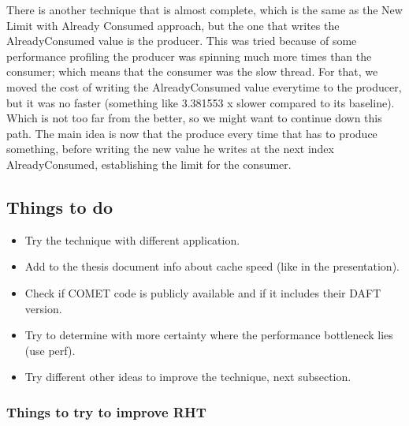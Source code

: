 There is another technique that is almost complete, which is the same as the New Limit with Already Consumed approach, but the one that writes the AlreadyConsumed value is the producer. This was tried because of some performance profiling the producer was spinning much more times than the consumer; which means that the consumer was the slow thread. For that, we moved the cost of writing the AlreadyConsumed value everytime to the producer, but it was no faster (something like 3.381553 x slower compared to its baseline). Which is not too far from the better, so we might want to continue down this path. The main idea is now that the produce every time that has to produce something, before writing the new value he writes at the next index AlreadyConsumed, establishing the limit for the consumer. 
\subsection{Things to do}
\label{subsec:thingsToDo}

\begin{itemize}
\item Try the technique with different application. 
\item Add to the thesis document info about cache speed (like in the presentation).
\item Check if COMET code is publicly available and if it includes their DAFT version.
\item Try to determine with more certainty where the performance bottleneck lies (use perf).
\item Try different other ideas to improve the technique, next subsection.
\end{itemize}

\subsubsection{Things to try to improve RHT}
\label{subsec:thingToTry}

